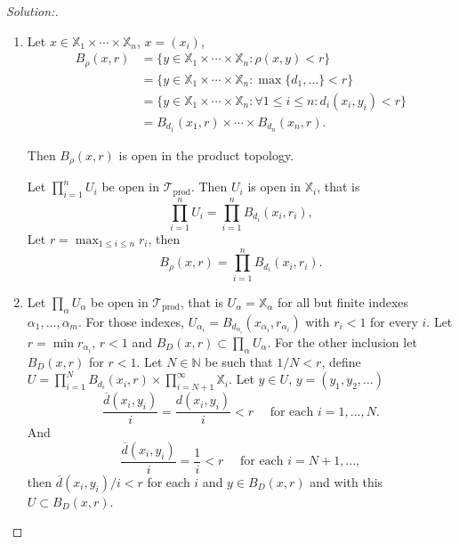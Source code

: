 \documentclass[a4paper,12pt, reqno]{article}
\theoremstyle{definition}
\newenvironment{solution}{\begin{proof}[Solution:]}{\end{proof}}
\newcommand{\T}{\mathscr{T}}
\newcommand{\N}{\mathbb{N}}
\newcommand{\X}{\mathbb{X}}
\begin{document}
\begin{solution}
  \begin{enumerate}[label=(\alph*)]
    \item Let $x\in\X_{1}\times\cdots\times\X_{n}$, $x = (x_{i})$,
          \begin{align*}
            B_{\rho}(x,r) & = \{ y\in\X_{1}\times\cdots\times\X_{n} : \rho(x,y)<r \}                                  \\
            & = \{ y\in\X_{1}\times\cdots\times\X_{n} : \max\{ d_{1},\dots \}<r \}                      \\
            & = \{ y\in\X_{1}\times\cdots\times\X_{n} : \forall 1\leq i\leq n : d_{i}(x_{i},y_{i})<r \} \\
            & = B_{d_{1}}(x_{1},r)\times\cdots\times B_{d_{n}}(x_{n},r).
          \end{align*}

          Then $B_{\rho}(x,r)$ is open in the product topology.

          Let $\prod_{i=1}^n U_{i}$ be open in $\T_{\text{prod}}$. Then $U_{i}$ is open in $\X_{i}$, that is
          \begin{equation*}
            \prod_{i=1}^n U_{i} = \prod_{i=1}^n B_{d_{i}}(x_{i},r_{i}),
          \end{equation*}
          Let $r = \max_{1\leq i\leq n}r_{i}$, then
          \begin{equation*}
            B_{\rho}(x,r) = \prod_{i=1}^n B_{d_{i}}(x_{i},r_{i}).
          \end{equation*}
    \item Let $\prod_{\alpha}U_{\alpha}$ be open in $\T_{\text{prod}}$, that is $U_{\alpha} = \X_{\alpha}$ for all but finite indexes $\alpha_{1},\dots,\alpha_{m}$. For those indexes, $U_{\alpha_{i}} = B_{d_{\alpha_{i}}}(x_{\alpha_{i}},r_{\alpha_{i } })$ with $r_{i}<1$ for every $i$. Let $r = \min r_{\alpha_{i}}$, $r<1$ and $B_{D}(x,r)\subset\prod_{\alpha}U_{\alpha}$.
          For the other inclusion let $B_{D}(x,r)$ for $r<1$. Let $N\in\N$ be such that $1/N <r$, define $U = \prod_{i=1}^N B_{d_{i}}(x_{i},r)\times \prod_{i=N+1}^\infty\X_{i}$. Let $y\in U$, $y = (y_{1},y_{2},\dots)$
          \begin{equation*}
            \frac{\overline{d}(x_{i},y_{i})}{i} = \frac{d(x_{i},y_{i})}{i}<r \quad \text{ for each }i=1,\dots,N.
          \end{equation*}
          And
          \begin{equation*}
            \frac{\overline{d}(x_{i},y_{i})}{i} = \frac{1}{i}< r \quad \text{ for each } i=N+1,\dots,
          \end{equation*}
          then $\overline{d}(x_{i},y_{i})/i<r$ for each $i$ and $y\in B_{D}(x,r)$ and with this $U\subset B_{D}(x,r)$.
  \end{enumerate}
\end{solution}
\end{document}
